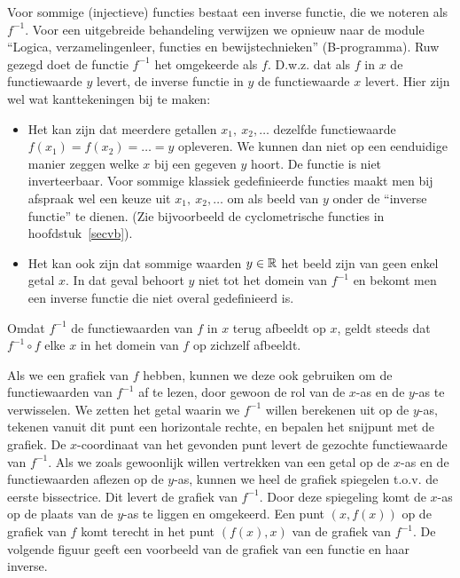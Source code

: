 Voor sommige (injectieve) functies bestaat een inverse functie, die we
noteren als $f^{-1}$. Voor een uitgebreide behandeling verwijzen we
opnieuw naar de module ``Logica, verzamelingenleer, functies en
bewijstechnieken'' (B-programma).  Ruw gezegd doet de functie $f^{-1}$
het omgekeerde als $f$. D.w.z. dat als $f$ in $x$ de functiewaarde $y$
levert, de inverse functie in $y$ de functiewaarde $x$ levert. Hier
zijn wel wat kanttekeningen bij te maken:
\begin{itemize}
\item Het kan zijn dat meerdere getallen $x_1,~x_2,\ldots$ dezelfde
  functiewaarde $f(x_1)=f(x_2)=\ldots=y$ opleveren. We kunnen dan niet
  op een eenduidige manier zeggen welke $x$ bij een gegeven $y$
  hoort. De functie is niet inverteerbaar. Voor sommige klassiek
  gedefinieerde functies maakt men bij afspraak wel een keuze uit
  $x_1,~x_2,\ldots$ om als beeld van $y$ onder de ``inverse functie''
  te dienen. (Zie bijvoorbeeld de cyclometrische functies in
  hoofdstuk~\ref{secvb}).
\item Het kan ook zijn dat sommige waarden $y\in\mathbb{R}$ het beeld zijn van
  geen enkel getal $x$. In dat geval behoort $y$ niet tot het domein
  van $f^{-1}$ en bekomt men een inverse functie die niet overal
  gedefinieerd is.
\end{itemize}
Omdat $f^{-1}$ de functiewaarden van $f$ in $x$ terug afbeeldt op $x$,
geldt steeds dat $f^{-1}\circ f$ elke $x$ in het domein van $f$ op
zichzelf afbeeldt.

Als we een grafiek van $f$ hebben, kunnen we deze ook gebruiken om de
functiewaarden van $f^{-1}$ af te lezen, door gewoon de rol van de
$x$-as en de $y$-as te verwisselen. We zetten het getal waarin we
$f^{-1}$ willen berekenen uit op de $y$-as, tekenen vanuit dit punt
een horizontale rechte, en bepalen het snijpunt met de grafiek.  De
$x$-coordinaat van het gevonden punt levert de gezochte functiewaarde
van $f^{-1}$. Als we zoals gewoonlijk willen vertrekken van een
getal op de $x$-as en de functiewaarden aflezen op de $y$-as, kunnen we
heel de grafiek spiegelen t.o.v. de eerste bissectrice. Dit levert de
grafiek van $f^{-1}$. Door deze spiegeling komt de $x$-as op de plaats
van de $y$-as te liggen en omgekeerd. Een punt $(x,f(x))$ op de
grafiek van $f$ komt terecht in het punt $(f(x),x)$ van de grafiek van
$f^{-1}$.
De volgende figuur geeft een voorbeeld van de grafiek van een functie
en haar inverse.

